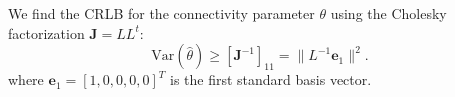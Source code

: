 
We find the CRLB for the connectivity parameter $\theta$ using the
Cholesky factorization $\mathbf{J} = LL^t$:
\begin{equation*}
\text{Var}(\hat{\theta}) \geq [\mathbf{J}^{-1}]_{11} = \|L^{-1}\mathbf{e}_1\|^2.
\end{equation*}
where $\mathbf{e}_1 = [1, 0, 0, 0, 0]^T$ is the first standard basis vector.
